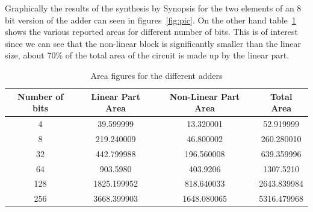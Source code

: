 \documentclass{article}
\begin{document}
Graphically the results of the synthesis by Synopsis for the two elements of an 8 bit version of the adder can seen in figures~\ref{fig:pic}. On the other hand table~\ref{tab:areas} shows the various reported areas for different number of bits. This is of interest since we can see that the non-linear block is significantly smaller than the linear size, about 70\% of the total area of the circuit is made up by the linear part.

\begin{table}[h]
        \centering
        \begin{tabular}{c | c | c | c}
                Number of bits & Linear Part Area & Non-Linear Part Area & Total Area \\
                \hline
                4 & 39.599999 & 13.320001 & 52.919999 \\
                8 & 219.240009& 46.800002 & 260.280010 \\
                32 & 442.799988& 196.560008& 639.359996 \\
                64 & 903.5980 & 403.9206 & 1307.5210 \\
                128 & 1825.199952 & 818.640033 & 2643.839984\\
                256 & 3668.399903 & 1648.080065 & 5316.479968\\
        \end{tabular}
        \caption{Area figures for the different adders}
        \label{tab:areas}
\end{table}
\end{document}

